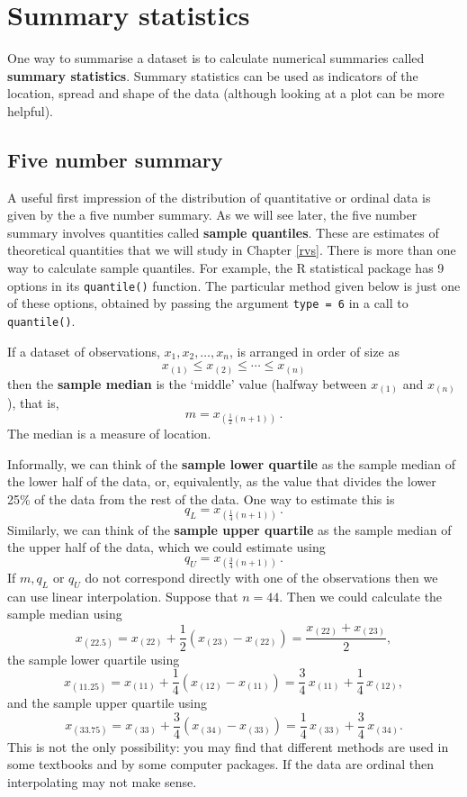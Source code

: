 \documentclass[
  british,
  11pt,
  openany, a4paper]{book}
\begin{document}
\section{Summary statistics}\label{summary-statistics}

One way to summarise a dataset is to calculate numerical summaries called \textbf{summary statistics}. Summary statistics can be used as indicators of the location, spread and shape of the data (although looking at a plot can be more helpful).

\subsection{Five number summary}\label{fivenumber}

A useful first impression of the distribution of quantitative or ordinal data is given by the a five number summary. As we will see later, the five number summary involves quantities called \textbf{sample quantiles}. These are estimates of theoretical quantities that we will study in Chapter \ref{rvs}. There is more than one way to calculate sample quantiles. For example, the R statistical package has 9 options in its \texttt{quantile()} function. The particular method given below is just one of these options, obtained by passing the argument \texttt{type\ =\ 6} in a call to \texttt{quantile()}.

If a dataset of observations, \(x_1,x_2,\ldots,x_n\), is arranged in order of size as \[ x_{(1)} \leq x_{(2)} \leq \cdots \leq x_{(n)}\] then the \textbf{sample median} is the `middle' value (halfway between \(x_{(1)}\) and \(x_{(n)}\)), that is,
\[ m=x_{(\frac{1}{2}(n+1))}\,.\]
The median is a measure of location.

Informally, we can think of the \textbf{sample lower quartile} as the sample median of the lower half of the data, or, equivalently, as the value that divides the lower 25\% of the data from the rest of the data. One way to estimate this is
\[ q_L=x_{(\frac{1}{4}(n+1))} \,.\]
Similarly, we can think of the \textbf{sample upper quartile} as the sample median of the upper half of the data, which we could estimate using
\[ q_U=x_{(\frac{3}{4}(n+1))}\,.\]
If \(m, q_L\) or \(q_U\) do not correspond directly with one of the observations
then we can use linear interpolation. Suppose that \(n=44\). Then we could calculate the sample median using
\[x_{(22.5)}=x_{(22)}+\frac12\left(x_{(23)}-
x_{(22)}\right)=\frac{x_{(22)}+x_{(23)}}{2}, \]
the sample lower quartile using
\[ x_{(11.25)}=x_{(11)}+\frac14\left(x_{(12)}-
x_{(11)}\right)=\frac34\,x_{(11)}+\frac14\,x_{(12)}, \]
and the sample upper quartile using
\[x_{(33.75)}=x_{(33)}+\frac34\left(x_{(34)}-
x_{(33)}\right)=\frac14\,x_{(33)}+\frac34\,x_{(34)}.\]
This is not the only possibility: you may find that different methods are used in some textbooks and by some computer packages. If the data are ordinal then interpolating may not make sense.
\end{document}
